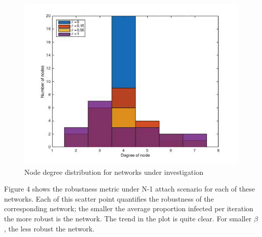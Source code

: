 \documentclass[11pt]{article}
\begin{document}
\begin{figure}[!htb]
\centering
\includegraphics[width=0.69\columnwidth]{images/node_degree_distribution_20.jpg}
\caption{Node degree distribution for networks under investigation}
\end{figure}

Figure 4 shows the robustness metric under N-1 attach scenario for each of these networks. Each of this scatter point quantifies the robustness of the corresponding network; the smaller the average proportion infected per iteration the more robust is the network. The trend in the plot is quite clear. For smaller $\beta$, the less robust the network. 

\newpage
\end{document}
